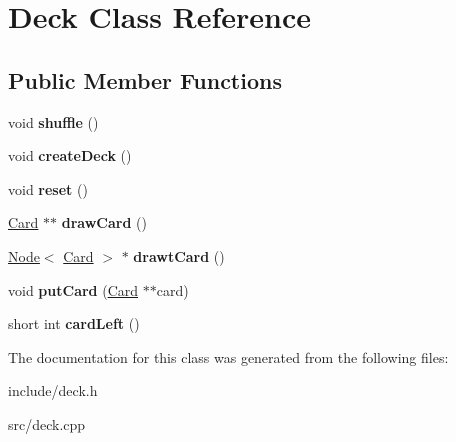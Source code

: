 \hypertarget{classDeck}{}\section{Deck Class Reference}
\label{classDeck}
\subsection*{Public Member Functions}
\begin{DoxyCompactItemize}
\item 
\mbox{\label{classDeck_ae5a1e52ab00ae5924f2bc6b730dba3eb}} 
void {\bfseries shuffle} ()
\item 
\mbox{\label{classDeck_a4cc7e93076105621411a7885db6c5347}} 
void {\bfseries create\+Deck} ()
\item 
\mbox{\label{classDeck_a14aa4f2f94b6b880cd575cf17af26762}} 
void {\bfseries reset} ()
\item 
\mbox{\label{classDeck_a20bd12c481b5e8620ab54e96ab256ec7}} 
\hyperlink{classCard}{Card} $\ast$$\ast$ {\bfseries draw\+Card} ()
\item 
\mbox{\label{classDeck_a4e7774435643a3a8d32411ddb10a71b4}} 
\hyperlink{structNode}{Node}$<$ \hyperlink{classCard}{Card} $>$ $\ast$ {\bfseries drawt\+Card} ()
\item 
\mbox{\label{classDeck_a91a42ff92ad997778fa3dfdf57799047}} 
void {\bfseries put\+Card} (\hyperlink{classCard}{Card} $\ast$$\ast$card)
\item 
\mbox{\label{classDeck_a7fab334c55bb624258a443742b3d97c2}} 
short int {\bfseries card\+Left} ()
\end{DoxyCompactItemize}


The documentation for this class was generated from the following files\+:\begin{DoxyCompactItemize}
\item 
include/deck.\+h\item 
src/deck.\+cpp\end{DoxyCompactItemize}
